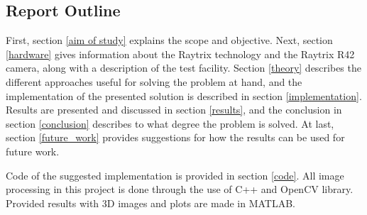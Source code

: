 \subsection{Report Outline} \label{report_outline}

First, section \ref{aim of study} explains the scope and objective. Next, section \ref{hardware} gives information about the Raytrix technology and the Raytrix R42 camera, along with a description of the test facility.
Section \ref{theory} describes the different approaches useful for solving the problem at hand, and the implementation of the presented solution is described in section \ref{implementation}.
Results are presented and discussed in section \ref{results}, and the conclusion in section \ref{conclusion} describes to what degree the problem is solved.
At last, section \ref{future_work} provides suggestions for how the results can be used for future work.

Code of the suggested implementation is provided in section \ref{code}.
All image processing in this project is done through the use of C++ and OpenCV library. Provided results with 3D images and plots are made in MATLAB.



